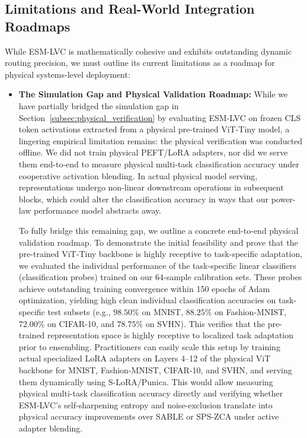 \subsection{Limitations and Real-World Integration Roadmaps}
\label{subsec:limitations}
While ESM-LVC is mathematically cohesive and exhibits outstanding dynamic routing precision, we must outline its current limitations as a roadmap for physical systems-level deployment:
\begin{itemize}
    \item \textbf{The Simulation Gap and Physical Validation Roadmap:} While we have partially bridged the simulation gap in Section~\ref{subsec:physical_verification} by evaluating ESM-LVC on frozen CLS token activations extracted from a physical pre-trained ViT-Tiny model, a lingering empirical limitation remains: the physical verification was conducted offline. We did not train physical PEFT/LoRA adapters, nor did we serve them end-to-end to measure physical multi-task classification accuracy under cooperative activation blending. In actual physical model serving, representations undergo non-linear downstream operations in subsequent blocks, which could alter the classification accuracy in ways that our power-law performance model abstracts away.
    
    To fully bridge this remaining gap, we outline a concrete end-to-end physical validation roadmap. To demonstrate the initial feasibility and prove that the pre-trained ViT-Tiny backbone is highly receptive to task-specific adaptation, we evaluated the individual performance of the task-specific linear classifiers (classification probes) trained on our 64-sample calibration sets. These probes achieve outstanding training convergence within 150 epochs of Adam optimization, yielding high clean individual classification accuracies on task-specific test subsets (e.g., $98.50\%$ on MNIST, $88.25\%$ on Fashion-MNIST, $72.00\%$ on CIFAR-10, and $78.75\%$ on SVHN). This verifies that the pre-trained representation space is highly receptive to localized task adaptation prior to ensembling. Practitioners can easily scale this setup by training actual specialized LoRA adapters on Layers 4--12 of the physical ViT backbone for MNIST, Fashion-MNIST, CIFAR-10, and SVHN, and serving them dynamically using S-LoRA/Punica. This would allow measuring physical multi-task classification accuracy directly and verifying whether ESM-LVC's self-sharpening entropy and noise-exclusion translate into physical accuracy improvements over SABLE or SPS-ZCA under active adapter blending.
    

\end{itemize}
